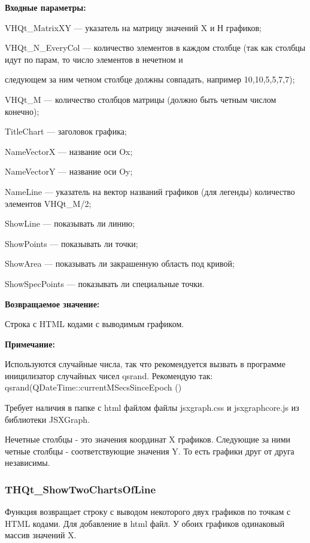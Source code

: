 \documentclass[a4paper,12pt]{article}
\begin{document}
\textbf{Входные параметры:}
 
VHQt\_MatrixXY --- указатель на матрицу значений X и Н графиков;
 
VHQt\_N\_EveryCol --- количество элементов в каждом столбце (так как столбцы идут по парам, то число элементов в нечетном и
 
следующем за ним четном столбце должны совпадать, например 10,10,5,5,7,7);
 
VHQt\_M --- количество столбцов матрицы (должно быть четным числом конечно);
 
TitleChart --- заголовок графика;
 
NameVectorX --- название оси Ox;
 
NameVectorY --- название оси Oy;
 
NameLine --- указатель на вектор названий графиков (для легенды) количество элементов VHQt\_M/2;
 
ShowLine --- показывать ли линию;
 
ShowPoints --- показывать ли точки;
 
ShowArea --- показывать ли закрашенную область под кривой;
 
ShowSpecPoints --- показывать ли специальные точки.

\textbf{Возвращаемое значение:}

Строка с HTML кодами с выводимым графиком.

\textbf{Примечание:}

Используются случайные числа, так что рекомендуется вызвать в программе иницилизатор случайных чисел qsrand. Рекомендую так: qsrand(QDateTime::currentMSecsSinceEpoch () %

Требует наличия в папке с html файлом файлы jsxgraph.css и jsxgraphcore.js из библиотеки JSXGraph.

Нечетные столбцы - это значения координат X графиков. Следующие за ними четные столбцы - соответствующие значения Y. То есть графики друг от друга независимы.


\subsubsection{THQt\_ShowTwoChartsOfLine}\label{THQt_ShowTwoChartsOfLine}

Функция возвращает строку с выводом некоторого двух графиков по точкам с HTML кодами. Для добавление в html файл. У обоих графиков одинаковый массив значений X.
\end{document}
